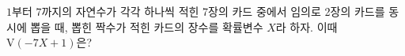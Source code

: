 $1$부터 $7$까지의 자연수가 각각 하나씩 적힌 7장의 카드 중에서 임의로 2장의 카드를 동시에 뽑을 때, 뽑힌 짝수가 적힌 카드의 장수를 확률변수 $X$라 하자. 이때 $\mathrm{V}(-7X+1)$은?
